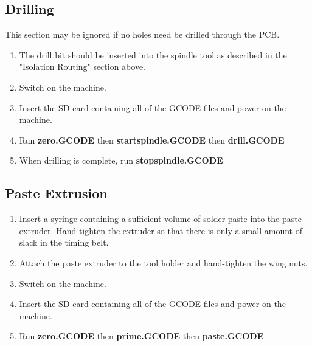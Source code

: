\documentclass[a4paper,11pt]{article}  %
\begin{document}
\subsection{Drilling}
This section may be ignored if no holes need be drilled through the PCB.

\begin{enumerate}
\item
The drill bit should be inserted into the spindle tool as described in 
the "Isolation Routing" section above.

\item
Switch on the machine.

\item
Insert the SD card containing all of the GCODE files and power on the 
machine.

\item
Run \textbf{zero.GCODE} then \textbf{startspindle.GCODE} then \textbf{drill.GCODE}

\item
When drilling is complete, run \textbf{stopspindle.GCODE}

\end{enumerate}

\subsection{Paste Extrusion}

\begin{enumerate}

\item
Insert a syringe containing a sufficient volume of solder paste into
the paste extruder. Hand-tighten the extruder so that there is only a 
small amount of slack in the timing belt.

\item
Attach the paste extruder to the tool holder and hand-tighten the wing 
nuts.

\item
Switch on the machine.

\item
Insert the SD card containing all of the GCODE files and power on the 
machine.

\item
Run \textbf{zero.GCODE} then \textbf{prime.GCODE} then \textbf{paste.GCODE}

\end{enumerate}
\end{document}
